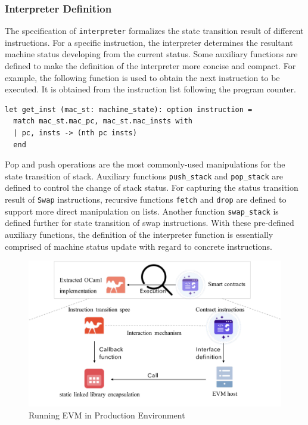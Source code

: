 \documentclass[runningheads]{llncs}
\begin{document}
\subsubsection{Interpreter Definition}\label{sec:interpreter}
The specification of \texttt{interpreter} formalizes the state transition result of different instructions. For a specific instruction, the interpreter determines the resultant machine status developing from the current status. Some auxiliary functions are defined
to make the definition of the interpreter more concise and compact. For example, the following function is used to obtain the next instruction to be executed. It is obtained from the instruction list following the program counter. 
\begin{verbatim}
let get_inst (mac_st: machine_state): option instruction =
  match mac_st.mac_pc, mac_st.mac_insts with 
  | pc, insts -> (nth pc insts) 
  end    
\end{verbatim}

Pop and push operations are the most commonly-used manipulations for the state transition of stack. Auxiliary functions \texttt{push\_stack} and \texttt{pop\_stack} are defined to control the change of stack status. For capturing the status transition result of \texttt{Swap} instructions, recursive functions \texttt{fetch} and \texttt{drop} are defined to support more direct manipulation on lists. Another function \texttt{swap\_stack} is defined further for state transition of swap instructions.
With these pre-defined auxiliary functions, the definition of the interpreter function is essentially comprised of machine status update with regard to concrete instructions. 

\begin{figure}[t]
  \centering
  \includegraphics[scale=0.4]{runninginPE.pdf}
  \caption{Running EVM in Production Environment}
   \label{fig2}
\end{figure}
\end{document}
